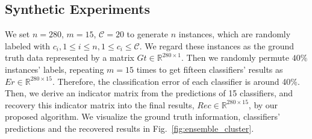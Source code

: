\documentclass[letterpaper]{article} %
\def\calC{{\mathcal{C}}}
\def\bL{{\bf L}}
\def\dsR{\mathds{R}}
\begin{document}
\subsection{Synthetic Experiments}

We set $n = 280$, $m = 15$, $\calC = 20$ to generate $n$ instances, which are randomly labeled with $c_i, 1 \leq i \leq n, 1 \leq c_i \leq \calC$.
We regard these instances as the ground truth data represented by a matrix $Gt \in \dsR^{280 \times 1}$.
Then we randomly permute $40\%$ instances' labels,
repeating $m = 15$ times to get fifteen classifiers' results as $Er \in \dsR^{280 \times 15}$.
Therefore, the classification error of each classifier is around 40\%.
Then, we derive an indicator matrix from the predictions of 15 classifiers,
and recovery this indicator matrix into the final results, $Rec \in \dsR^{280 \times 15}$, by our proposed algorithm.
We visualize the ground truth information, classifiers' predictions and the recovered results in Fig.~\ref{fig:ensemble_cluster}.
\end{document}
